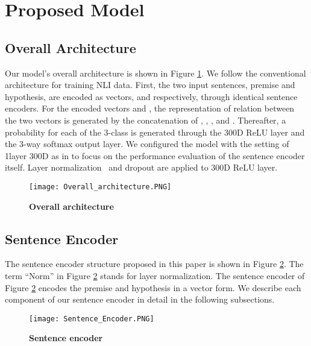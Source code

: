 \documentclass[11pt,letterpaper]{article}
\begin{document}
\section{Proposed Model}
\label{4}

\subsection{Overall Architecture}

Our model's overall architecture is shown in Figure \ref{Overall architecture}. We follow the conventional architecture for training NLI data. First, the two input sentences, premise and hypothesis, are encoded as vectors,  and  respectively, through identical sentence encoders. For the encoded vectors  and , the representation of relation between the two vectors is generated by the concatenation of , , , and . Thereafter, a probability for each of the 3-class is generated through the 300D ReLU layer and the 3-way softmax output layer. We configured the model with the setting of 1layer 300D as in \citet{DiSAN} to focus on the performance evaluation of the sentence encoder itself. Layer normalization~\citep{LN} and dropout are applied to 300D ReLU layer.

\begin{figure}[h]
\begin{center}
	\texttt{[image: Overall\_architecture.PNG]}
\caption{\textbf{Overall architecture}}
\label{Overall architecture}
\end{center}
\end{figure}

\subsection{Sentence Encoder}

The sentence encoder structure proposed in this paper is shown in Figure \ref{Sentence encoder}. The term \enquote{Norm} in Figure \ref{Sentence encoder} stands for layer normalization. The sentence encoder of Figure \ref{Sentence encoder} encodes the premise and hypothesis in a vector form. We describe each component of our sentence encoder in detail in the following subsections.

\begin{figure}[h]
\begin{center}
	\texttt{[image: Sentence\_Encoder.PNG]}
    
\caption{\textbf{Sentence encoder}}
\label{Sentence encoder}
\end{center}
\end{figure}
\end{document}
